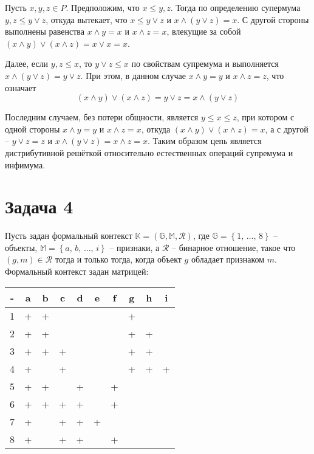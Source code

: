 \documentclass[a4paper]{article}
\newcommand{\obj}[1]{\left\{ #1 \right \}}
\newcommand{\brac}[1]{\left ( #1 \right )}
\begin{document}
Пусть $x,y,z\in P$. Предположим, что $x\leq y,z$. Тогда по определению супермума $y,z\leq y\vee z$, откуда вытекает, что $x\leq y\vee z$ и $x \wedge (y\vee z) = x$. С другой стороны выполнены равенства $x\wedge y = x$ и $x\wedge z = x$, влекущие за собой $(x\wedge y) \vee (x\wedge z) = x\vee x = x$.

Далее, если $y,z\leq x$, то $y\vee z\leq x$ по свойствам супремума и выполняется $x\wedge (y\vee z) = y\vee z$. При этом, в данном случае $x\wedge y = y$ и $x\wedge z = z$, что означает \[(x\wedge y)\vee (x\wedge z) = y\vee z = x\wedge (y\vee z)\]

Последним случаем, без потери общности, является $y\leq x\leq z$, при котором с одной стороны $x\wedge y = y$ и $x\wedge z = x$, откуда $(x\wedge y)\vee (x\wedge z)=x$, а с другой -- $y\vee z = z$ и $x\wedge (y\vee z) = x\wedge z = x$. Таким образом цепь является дистрибутивной решёткой относительно естественных операций супремума и инфимума.


\section{Задача 4} %
\label{sec:task_4}

Пусть задан формальный контекст $\mathbb{K} = \brac{\mathbb{G}, \mathbb{M}, \mathcal{R}}$, где $\mathbb{G} = \obj{1,\,\dots,\,8}$ -- объекты, $\mathbb{M} = \obj{a,\,b,\,\ldots,\,i}$ -- признаки, а $\mathcal{R}$ -- бинарное отношение, такое что $(g,m)\in \mathcal{R}$ тогда и только тогда, когда объект $g$ обладает признаком $m$. Формальный контекст задан матрицей:
\begin{center}\begin{tabular}{| c | c | c | c | c | c | c | c | c | c |}
\hline
- & a & b & c & d & e & f & g & h & i \\ \hline
1 & + & + &   &   &   &   & + &   &   \\ \hline
2 & + & + &   &   &   &   & + & + &   \\ \hline
3 & + & + & + &   &   &   & + & + &   \\ \hline
4 & + &   & + &   &   &   & + & + & + \\ \hline
5 & + & + &   & + &   & + &   &   &   \\ \hline
6 & + & + & + & + &   & + &   &   &   \\ \hline
7 & + &   & + & + & + &   &   &   &   \\ \hline
8 & + &   & + & + &   & + &   &   &   \\ \hline\hline
\end{tabular}\end{center}
\end{document}
